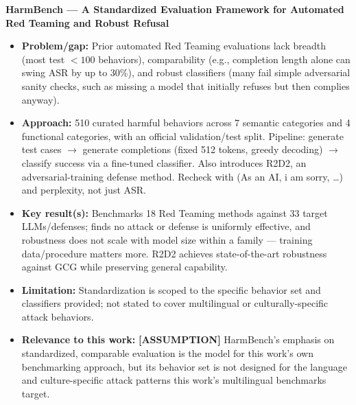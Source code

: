 \documentclass[a4paper,12pt]{report}
\begin{document}
\vspace{0.5em}
\textbf{HarmBench — A Standardized Evaluation Framework for Automated Red Teaming and Robust Refusal}
\begin{itemize}
    \item \textbf{Problem/gap:} Prior automated Red Teaming evaluations lack breadth (most test 
$<100$ behaviors), comparability (e.g., completion length alone can swing ASR by up to 
30\%), and robust classifiers (many fail simple adversarial sanity checks, such as missing 
a model that initially refuses but then complies anyway).
    
    \item \textbf{Approach:} 510 curated harmful behaviors across 7 semantic categories and 4 functional categories, with an official validation/test split. Pipeline: generate test cases $\rightarrow$ generate completions (fixed 512 tokens, greedy decoding) $\rightarrow$ classify success via a fine-tuned classifier. Also introduces R2D2, an adversarial-training defense method. Recheck with (As an AI, i am sorry, …) and perplexity, not just ASR.
    
    \item \textbf{Key result(s):} Benchmarks 18 Red Teaming methods against 33 target LLMs/defenses; finds no attack or defense is uniformly effective, 
    and robustness does not scale with model size within a family — training data/procedure matters more. R2D2 achieves state-of-the-art robustness against 
    GCG while preserving general capability.
    
    \item \textbf{Limitation:} Standardization is scoped to the specific behavior set and classifiers provided; not stated to cover multilingual or 
    culturally-specific attack behaviors.
    
    \item \textbf{Relevance to this work:} \textbf{[ASSUMPTION]} HarmBench's emphasis on standardized, comparable evaluation is the model for this work's 
    own benchmarking approach, but its behavior set is not designed for the language and culture-specific attack patterns this work's multilingual benchmarks target.
\end{itemize}
\end{document}

